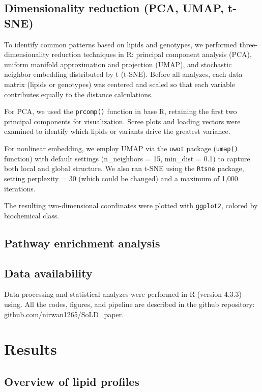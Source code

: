 \documentclass[10pt,letterpaper]{article}
\begin{document}
\subsection*{Dimensionality reduction (PCA, UMAP, t-SNE)}  
To identify common patterns based on lipids and genotypes, we performed three-dimensionality reduction techniques in R: principal component analysis (PCA), uniform manifold approximation and projection (UMAP), and stochastic neighbor embedding distributed by t (t-SNE).  Before all analyzes, each data matrix (lipids or genotypes) was centered and scaled so that each variable contributes equally to the distance calculations.

For PCA, we used the \texttt{prcomp()} function in base R, retaining the first two principal components for visualization.  Scree plots and loading vectors were examined to identify which lipids or variants drive the greatest variance.  

For nonlinear embedding, we employ UMAP via the \texttt{uwot} package (\texttt{umap()} function) with default settings (n\_neighbors = 15, min\_dist = 0.1) to capture both local and global structure.  We also ran t-SNE using the \texttt{Rtsne} package, setting perplexity = 30 (which could be changed) and a maximum of 1,000 iterations.  

The resulting two-dimensional coordinates were plotted with \texttt{ggplot2}, colored by biochemical class.

\subsection*{Pathway enrichment analysis}

\subsection*{Data availability}
Data processing and statistical analyzes were performed in R (version 4.3.3) using. All the codes, figures, and pipeline are described in the github repository: github.com/nirwan1265/SoLD_paper.

\section*{Results}

\subsection*{Overview of lipid profiles}
\end{document}
